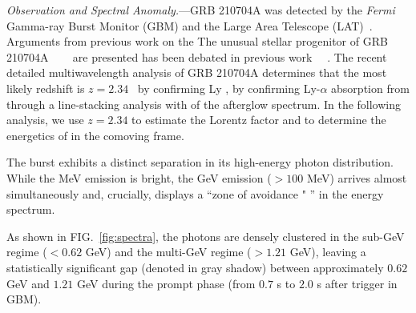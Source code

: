 \documentclass[prd,twocolumn,amsmath,amssymb,aps,linenumbers]{revtex4-2} %
\providecommand{\DIFaddtex}[1]{{\protect\color{blue} \sf #1}} %
\providecommand{\DIFdeltex}[1]{{\protect\color{red} \scriptsize #1}} %
\providecommand{\DIFaddbegin}{} %
\providecommand{\DIFaddend}{} %
\providecommand{\DIFdelbegin}{} %
\providecommand{\DIFdelend}{} %
\providecommand{\DIFadd}[1]{\texorpdfstring{\DIFaddtex{#1}}{#1}} %
\providecommand{\DIFdel}[1]{\texorpdfstring{\DIFdeltex{#1}}{}} %
\newcommand{\DIFscaledelfig}{0.5}
\newlength{\DIFdelgraphicswidth} %
\newlength{\DIFdelgraphicsheight} %
\newcommand{\DIFaddincludegraphics}[2][]{{\color{blue}\fbox{\DIFOincludegraphics[#1]{#2}}}} %
\newcommand{\DIFdelincludegraphics}[2][]{%
\sbox{\DIFdelgraphicsbox}{\DIFOincludegraphics[#1]{#2}}%
\settoboxwidth{\DIFdelgraphicswidth}{\DIFdelgraphicsbox} %
\settoboxtotalheight{\DIFdelgraphicsheight}{\DIFdelgraphicsbox} %
\scalebox{\DIFscaledelfig}{%
\parbox[b]{\DIFdelgraphicswidth}{\usebox{\DIFdelgraphicsbox}\\[-\baselineskip] \rule{\DIFdelgraphicswidth}{0em}}\llap{\resizebox{\DIFdelgraphicswidth}{\DIFdelgraphicsheight}{%
\setlength{\unitlength}{\DIFdelgraphicswidth}%
\begin{picture}(1,1)%
\thicklines\linethickness{2pt} %
{\color[rgb]{1,0,0}\put(0,0){\framebox(1,1){}}}%
{\color[rgb]{1,0,0}\put(0,0){\line( 1,1){1}}}%
{\color[rgb]{1,0,0}\put(0,1){\line(1,-1){1}}}%
\end{picture}%
}\hspace*{3pt}}} %
} %
\DeclareRobustCommand{\DIFaddbegin}{\DIFOaddbegin \let\includegraphics\DIFaddincludegraphics} %
\DeclareRobustCommand{\DIFaddend}{\DIFOaddend \let\includegraphics\DIFOincludegraphics} %
\DeclareRobustCommand{\DIFdelbegin}{\DIFOdelbegin \let\includegraphics\DIFdelincludegraphics} %
\DeclareRobustCommand{\DIFdelend}{\DIFOaddend \let\includegraphics\DIFOincludegraphics} %
\begin{document}
\textit{Observation and Spectral Anomaly.}---GRB 210704A was detected by the \textit{Fermi} Gamma-ray Burst Monitor (GBM) and the Large Area Telescope (LAT)~\citep{2021GCN.30380....1M,2021GCN.30375....1B}. 
\DIFdelbegin \DIFdel{Arguments from previous work on the }\DIFdelend \DIFaddbegin \DIFadd{The }\DIFaddend unusual stellar progenitor of GRB 210704A \DIFdelbegin \DIFdel{~\mbox{%
\citep{2021GCN.30380....1M,2023MNRAS.522.5204B} }\hskip0pt%
are presented}\DIFdelend \DIFaddbegin \DIFadd{has been debated in previous work~\mbox{%
\citep{2021GCN.30380....1M,2023MNRAS.522.5204B}}\hskip0pt%
}\DIFaddend . The recent detailed multiwavelength analysis of GRB 210704A determines that the most likely redshift is $z=2.34$~\cite{2026MNRAS.548ag555P}\DIFdelbegin \DIFdel{by confirming Ly }\DIFdelend \DIFaddbegin \DIFadd{, by confirming Ly-}\DIFaddend $\alpha$ absorption \DIFdelbegin \DIFdel{from }\DIFdelend \DIFaddbegin \DIFadd{through a }\DIFaddend line-stacking analysis \DIFdelbegin \DIFdel{with }\DIFdelend \DIFaddbegin \DIFadd{of the }\DIFaddend afterglow spectrum. In the following analysis, we use $z=2.34$ to estimate the Lorentz factor and to determine the energetics \DIFdelbegin \DIFdel{of }\DIFdelend \DIFaddbegin \DIFadd{in }\DIFaddend the comoving frame.

The burst exhibits a distinct separation in its high-energy photon distribution. While the MeV emission is bright, the GeV emission ($>100$ MeV) arrives almost simultaneously and, crucially, displays a ``zone of avoidance\DIFdelbegin \DIFdel{" }\DIFdelend \DIFaddbegin \DIFadd{'' }\DIFaddend in the energy spectrum.

As shown in FIG.~\ref{fig:spectra}, the photons are densely clustered in the sub-GeV regime ($<0.62$ GeV) and the multi-GeV regime ($>1.21$ GeV), leaving a statistically significant gap (denoted in gray shadow) between approximately $0.62$ GeV and $1.21$ GeV during the prompt phase (from $0.7$ s to $2.0$ s after trigger in GBM).
\end{document}
